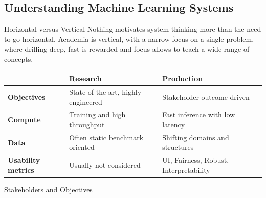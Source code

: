 \subsection{Understanding Machine Learning Systems}

\begin{frame}{Horizontal versus Vertical}
  Nothing motivates \alert{system} thinking more than the need to go \alert{horizontal}.
  Academia is vertical, with a narrow focus on a single problem, where drilling deep, fast is rewarded and
  focus allows to teach a wide range of concepts.
  \vspace{0.8em}

  \renewcommand{\arraystretch}{1.25}
  
  \begin{tabular}{@{}%
    >{\raggedright\arraybackslash}p{}%
    >{\raggedright\arraybackslash}p{}%
    >{\raggedright\arraybackslash}p{}@{}}
    \toprule
     & \textbf{Research} & \textbf{Production}\\
    \midrule
    \textbf{Objectives} & State of the art, highly engineered &  Stakeholder outcome driven \\
    \textbf{Compute} & Training and high throughput &  Fast inference with low latency \\
    \textbf{Data} & Often static benchmark oriented & Shifting domains and structures  \\
    \textbf{Usability metrics} & Usually not considered & UI, Fairness, Robust, Interpretability \\
    \bottomrule
  \end{tabular}
\end{frame}





\begin{frame}{Stakeholders and Objectives}
\end{frame}


